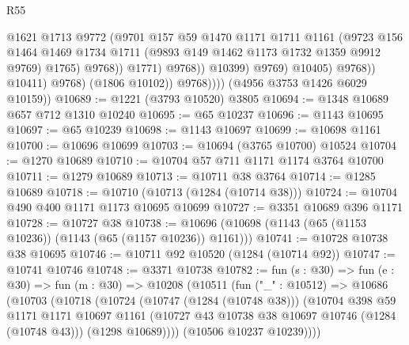 \begin{lexlean}{R55}
\begin{coremodule}
                                      @1621
                                      @1713
                                      @9772
                                      (@9701
                                        @157
                                        @59
                                        @1470
                                        @1171
                                        @1711
                                        @1161
                                        (@9723
                                          @156
                                          @1464
                                          @1469
                                          @1734
                                          @1711
                                          (@9893 @149 @1462 @1173 @1732 @1359 @9912 @9769)
                                          @1765)
                                        @9768))
                                    @1771)
                                  @9768))
                              @10399)
                            @9769)
                          @10405)
                        @9768))
                    @10411)
                  @9768)
                (@1806 @10102))
              @9768))))
      (@4956 @3753 @1426 @6029 @10159))
@10689 := @1221 (@3793 @10520) @3805
@10694 := @1348 @10689 @657 @712 @1310 @10240
@10695 := @65 @10237
@10696 := @1143 @10695
@10697 := @65 @10239
@10698 := @1143 @10697
@10699 := @10698 @1161
@10700 := @10696 @10699
@10703 := @10694 (@3765 @10700) @10524
@10704 := @1270 @10689
@10710 := @10704 @57 @711 @1171 @1174 @3764 @10700
@10711 := @1279 @10689
@10713 := @10711 @38 @3764
@10714 := @1285 @10689
@10718 := @10710 (@10713 (@1284 (@10714 @38)))
@10724 := @10704 @490 @400 @1171 @1173 @10695 @10699
@10727 := @3351 @10689 @396 @1171
@10728 := @10727 @38
@10738 := @10696 (@10698 (@1143 (@65 (@1153 @10236)) (@1143 (@65 (@1157 @10236)) @1161)))
@10741 := @10728 @10738 @38 @10695
@10746 := @10711 @92 @10520 (@1284 (@10714 @92))
@10747 := @10741 @10746
@10748 := @3371 @10738
@10782 := fun (s : @30) =>
  fun (e : @30) =>
  fun (m : @30) =>
  @10208
    (@10511
      (fun ("_" : @10512) =>
      @10686
        (@10703
          (@10718
            (@10724
              (@10747 (@1284 (@10748 @38)))
              (@10704
                @398
                @59
                @1171
                @1171
                @10697
                @1161
                (@10727 @43 @10738 @38 @10697 @10746 (@1284 (@10748 @43)))
                (@1298 @10689))))
          (@10506 @10237 @10239))))

\end{coremodule}
\end{lexlean}
